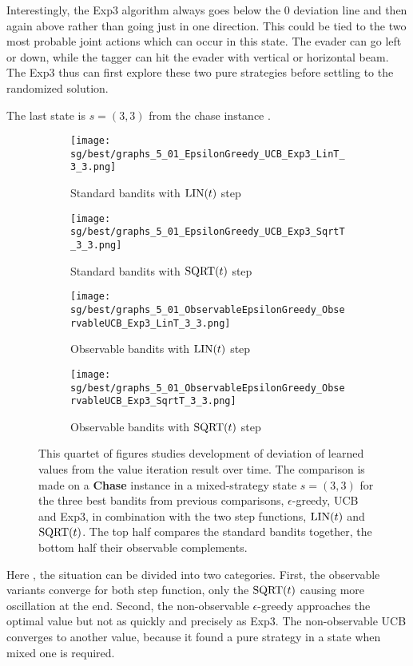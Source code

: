 \documentclass[../main.tex]{subfiles}
\begin{document}
Interestingly, the Exp3 algorithm always goes below the 0 deviation line and then again above rather than going just in one direction.
This could be tied to the two most probable joint actions which can occur in this state.
The evader can go left or down, while the tagger can hit the evader with vertical or horizontal beam.
The Exp3 thus can first explore these two pure strategies before settling to the randomized solution.

The last state is $s = \left(3, 3\right)$ from the chase instance .
\begin{figure}[ht]
    \begin{subfigure}[t]{0.45\linewidth}
        \texttt{[image: sg/best/graphs\_5\_01\_EpsilonGreedy\_UCB\_Exp3\_LinT\_3\_3.png]}
        \caption{Standard bandits with $\text{LIN}(t)$ step}
        \label{exp:sg:best:5:33:std:lin}
    \end{subfigure}
    \hfill
    \begin{subfigure}[t]{0.45\linewidth}
        \texttt{[image: sg/best/graphs\_5\_01\_EpsilonGreedy\_UCB\_Exp3\_SqrtT\_3\_3.png]}
        \caption{Standard bandits with $\text{SQRT}(t)$ step}
        \label{exp:sg:best:5:33:std:sqrt}
    \end{subfigure}
    \begin{subfigure}[t]{0.45\linewidth}
        \texttt{[image: sg/best/graphs\_5\_01\_ObservableEpsilonGreedy\_ObservableUCB\_Exp3\_LinT\_3\_3.png]}
        \caption{Observable bandits with $\text{LIN}(t)$ step}
        \label{exp:sg:best:5:33:obs:lint}
    \end{subfigure}
    \hfill
    \begin{subfigure}[t]{0.45\linewidth}
        \texttt{[image: sg/best/graphs\_5\_01\_ObservableEpsilonGreedy\_ObservableUCB\_Exp3\_SqrtT\_3\_3.png]}
        \caption{Observable bandits with $\text{SQRT}(t)$ step}
        \label{exp:sg:best:5:33:obs:sqrt}
    \end{subfigure}
    \caption[Comparison of three best bandits and their observable counterparts on  in a state $s = \left(3, 3\right)$]{
        This quartet of figures studies development of deviation of learned values from the value iteration result over time.
        The comparison is made on a \textbf{Chase} instance  in a mixed-strategy state $s = \left(3, 3\right)$ for the three best bandits from previous comparisons, $\epsilon$-greedy, UCB and Exp3, in combination with the two step functions, $\text{LIN}(t)$ and $\text{SQRT}(t)$.
        The top half compares the standard bandits together, the bottom half their observable complements.
    }
    \label{exp:sg:best:5:33}
\end{figure}
Here , the situation can be divided into two categories.
First, the observable variants converge for both step function, only the $\text{SQRT}(t)$ causing more oscillation at the end.
Second, the non-observable $\epsilon$-greedy approaches the optimal value but not as quickly and precisely as Exp3.
The non-observable UCB converges to another value, because it found a pure strategy in a state when mixed one is required.
\end{document}

